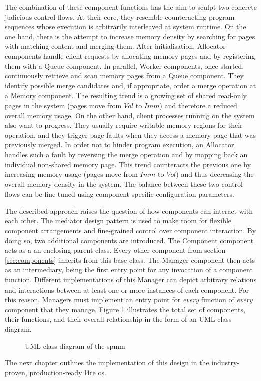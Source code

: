 The combination of these component functions has the aim to sculpt two concrete judicious control flows.
At their core, they resemble counteracting program sequences whose execution is arbitrarily interleaved at system runtime.
On the one hand, there is the attempt to increase memory density by searching for pages with matching content and merging them.
After initialisation, Allocator components handle client requests by allocating memory pages and by registering them with a Queue component.
In parallel, Worker components, once started, continuously retrieve and scan memory pages from a Queue component.
They identify possible merge candidates and, if appropriate, order a merge operation at a Memory component.
The resulting trend is a growing set of shared read-only pages in the system (pages move from $Vol$ to $Imm$) and therefore a reduced overall memory usage.
On the other hand, client processes running on the system also want to progress.
They usually require writable memory regions for their operation, and they trigger page faults when they access a memory page that was previously merged.
In order not to hinder program execution, an Allocator handles such a fault by reversing the merge operation and by mapping back an individual non-shared memory page.
This trend counteracts the previous one by increasing memory usage (pages move from $Imm$ to $Vol$) and thus decreasing the overall memory density in the system.
The balance between these two control flows can be fine-tuned using component specific configuration parameters.

The described approach raises the question of how components can interact with each other.
The mediator design pattern is used to make room for flexible component arrangements and fine-grained control over component interaction.
By doing so, two additional components are introduced.
The Component component acts as a an enclosing parent class.
Every other component from section \ref{sec:components} inherits from this base class.
The Manager component then acts as an intermediary, being the first entry point for any invocation of a component function.
Different implementations of this Manager can depict arbitrary relations and interactions between at least one or more instances of each component.
For this reason, Managers must implement an entry point for \textit{every} function of \textit{every} component that they manage.
Figure \ref{fig:umlcd} illustrates the total set of components, their functions, and their overall relationship in the form of an UML class diagram.

\begin{figure}
  \centering
  
  \caption{UML class diagram of the \acs{spmm}}
  \label{fig:umlcd}
\end{figure}

The next chapter outlines the implementation of this design in the industry-proven, production-ready \ac{l4re} \ac{os}.
